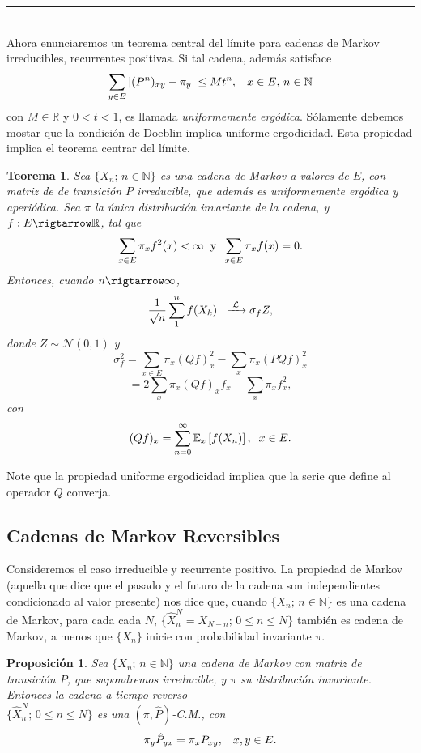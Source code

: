 \documentclass[a4paper]{article}
\newtheorem{teorema}{Teorema}
\newtheorem{prop}{Proposici\'on}
\numberwithin{equation}{subsection}
\def\R{\mathbb R}
\def\N{\mathbb N}
\def\E{\mathbb E}
\begin{document}
\rule{0.7em}{0.7em}\\ \newline
Ahora enunciaremos un teorema central del límite para cadenas de Markov irreducibles, recurrentes positivas. Si tal cadena, además satisface
\[\sum_{y \in E}|(P^n)_{xy}-\pi_y| \leq Mt^n,\hspace{0.3cm}x \in E,\,n\in \N\]
con $M\in \R$ y $0<t<1$, es llamada \textit{uniformemente ergódica}. Sólamente debemos mostar que la condición de Doeblin implica uniforme ergodicidad. Esta propiedad implica el teorema centrar del límite.

\begin{teorema}
Sea $\{X_n;\,n\in \N\}$ es una cadena de Markov a valores de $E$, con matriz de de transición $P$ irreducible, que además es uniformemente ergódica y aperiódica. Sea $\pi$ la única distribución invariante de la cadena, y $f:E\rigtarrow \R$, tal que
\[\sum_{x\in E}\pi_x f^2(x) < \infty \hspace{0.2cm}\text{y}\hspace{0.2cm}\sum_{x \in E}\pi_x f(x) = 0.\]
Entonces, cuando $n\rigtarrow \infty$,
\[\frac{1}{\sqrt{n}}\sum_1^nf(X_k)\hspace{0.2cm}\xrightarrow{\,\,\mathcal{L}\,\,}\sigma_f Z,\]
donde $Z\sim \mathcal{N}(0,1)$ y
\[\sigma_f^2 = \sum_{x \in E}\pi_x (Qf)_x^2 - \sum_x \pi_x (PQf)_x^2\]
\[= 2\sum_x \pi_x (Qf)_x f_x - \sum_x \pi_x f_x^2,\]
con 
\[(Qf)_x = \sum_{n=0}^{\infty}\E_x\left[f(X_n)\right],\hspace{0.2cm}x\in E.\]
\end{teorema}

Note que la propiedad uniforme ergodicidad implica que la serie que define al operador $Q$ converja.

\subsection{Cadenas de Markov Reversibles}
Consideremos el caso irreducible y recurrente positivo. La propiedad de Markov (aquella que dice que el pasado y el futuro de la cadena son independientes condicionado al valor presente) nos dice que, cuando $\{X_n;\,n\in \N\}$ es una cadena de Markov, para cada cada $N$, $\{\hat{X}_n^N = X_{N-n};\,0\leq n \leq N\}$ también es cadena de Markov, a menos que $\{X_n\}$ inicie con probabilidad invariante $\pi$.
\begin{prop}
Sea $\{X_n;\,n\in\N\}$ una cadena de Markov con matriz de transición $P$, que supondremos irreducible, y $\pi$ su distribución invariante. Entonces la cadena a tiempo-reverso\\ $\{\hat{X}_n^N;\,0\leq n\leq N\}$ es una $(\pi,\hat{P})$-C.M., con
\[\pi_y \hat{P}_{yx} = \pi_x P_{xy},\hspace{0.3cm}x,y\in E.\]
\end{prop}
\end{document}
